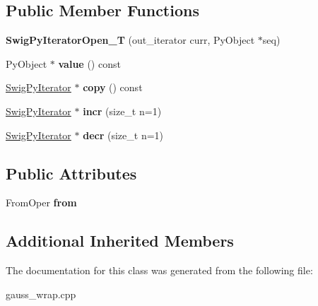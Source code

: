 \subsection*{Public Member Functions}
\begin{DoxyCompactItemize}
\item 
\hypertarget{classswig_1_1_swig_py_iterator_open___t_aad68570a11be76ad2e4c5abbdca54b1e}{{\bfseries Swig\-Py\-Iterator\-Open\-\_\-\-T} (out\-\_\-iterator curr, Py\-Object $\ast$seq)}\label{classswig_1_1_swig_py_iterator_open___t_aad68570a11be76ad2e4c5abbdca54b1e}

\item 
\hypertarget{classswig_1_1_swig_py_iterator_open___t_ad640ab62c2d3f76cb418ba3b9ec7e613}{Py\-Object $\ast$ {\bfseries value} () const }\label{classswig_1_1_swig_py_iterator_open___t_ad640ab62c2d3f76cb418ba3b9ec7e613}

\item 
\hypertarget{classswig_1_1_swig_py_iterator_open___t_a8a751bd7a50451246031b02e16a690f3}{\hyperlink{structswig_1_1_swig_py_iterator}{Swig\-Py\-Iterator} $\ast$ {\bfseries copy} () const }\label{classswig_1_1_swig_py_iterator_open___t_a8a751bd7a50451246031b02e16a690f3}

\item 
\hypertarget{classswig_1_1_swig_py_iterator_open___t_a6d7ddd4cc294d13214372f7619cb7ce5}{\hyperlink{structswig_1_1_swig_py_iterator}{Swig\-Py\-Iterator} $\ast$ {\bfseries incr} (size\-\_\-t n=1)}\label{classswig_1_1_swig_py_iterator_open___t_a6d7ddd4cc294d13214372f7619cb7ce5}

\item 
\hypertarget{classswig_1_1_swig_py_iterator_open___t_a5e556e6e84a3684129c79d38c171e976}{\hyperlink{structswig_1_1_swig_py_iterator}{Swig\-Py\-Iterator} $\ast$ {\bfseries decr} (size\-\_\-t n=1)}\label{classswig_1_1_swig_py_iterator_open___t_a5e556e6e84a3684129c79d38c171e976}

\end{DoxyCompactItemize}
\subsection*{Public Attributes}
\begin{DoxyCompactItemize}
\item 
\hypertarget{classswig_1_1_swig_py_iterator_open___t_a1fdd8b3f85a163f2c5a0aa8bf4cb996d}{From\-Oper {\bfseries from}}\label{classswig_1_1_swig_py_iterator_open___t_a1fdd8b3f85a163f2c5a0aa8bf4cb996d}

\end{DoxyCompactItemize}
\subsection*{Additional Inherited Members}


The documentation for this class was generated from the following file\-:\begin{DoxyCompactItemize}
\item 
gauss\-\_\-wrap.\-cpp\end{DoxyCompactItemize}
